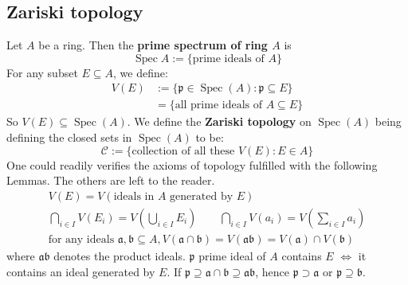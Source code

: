 \documentclass[12pt]{article}
\theoremstyle{definition}
\theoremstyle{plain}
\DeclareMathOperator{\Spec}{Spec}
\begin{document}
\subsection{Zariski topology}
\Def Let $A$ be a ring. Then the \textbf{prime spectrum of ring $A$} is
$$\Spec{A}:=\{\text{prime ideals of }A\}$$
 For any subset $E\subseteq A$, we define:
\begin{align*}
  V(E)&:=\{\mathfrak{p}\in \Spec(A): \mathfrak{p}\subseteq E\}\\
  &=\{\text{all prime ideals of }A\subseteq E\}
\end{align*}
So $V(E)\subseteq \Spec(A)$.
\Def We define the \textbf{Zariski topology} on $\Spec(A)$ being defining the closed sets in $\Spec(A)$ to be:
$$\mathcal{C}:=\{\text{collection of all these }V(E): E\in A\}$$
\Rmk One could readily verifies the axioms of topology fulfilled with the following Lemmas. The others are left to the reader.
\Lemma \begin{gather}
  V(E)=V(\text{ideals in }A\text{ generated by }E)\\
  \bigcap_{i\in I}V(E_i)=V(\bigcup_{i\in I}E_i) \qquad \bigcap_{i\in I}V(a_i)=V(\sum_{i\in I}a_i)\\
  \text{for any ideals }\mathfrak{a}, \mathfrak{b}\subseteq A, V(\mathfrak{a}\cap \mathfrak{b})=V(\mathfrak{a}\mathfrak{b})=V(\mathfrak{a})\cap V(\mathfrak{b})
\end{gather}
where $\mathfrak{a}\mathfrak{b}$ denotes the product ideals.
\proof $\mathfrak{p}$ prime ideal of $A$ contains $E$ $\iff$ it contains an ideal generated by $E$. If $\mathfrak{p}\supseteq \mathfrak{a}\cap \mathfrak{b}\supseteq \mathfrak{a}\mathfrak{b}$, hence $\mathfrak{p}\supset\mathfrak{a}$ or $\mathfrak{p}\supseteq\mathfrak{b}$.
\Ex \leavevmode
\end{document}
